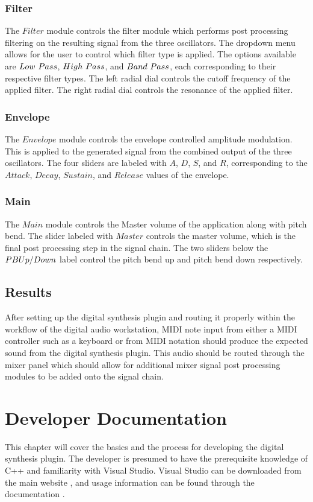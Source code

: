 \documentclass[a4paper,12pt]{report}
\begin{document}
\subsection{Filter}
\label{subsec:filter}
The $Filter$ module controls the filter module which performs post processing filtering on the resulting signal from the three oscillators. The dropdown menu allows for the user to control which filter type is applied. The options available are $Low\ \-Pass$, $High\ \-Pass$, and $Band\ \-Pass$, each corresponding to their respective filter types. The left radial dial controls the cutoff frequency of the applied filter. The right radial dial controls the resonance of the applied filter.

\subsection{Envelope}
\label{subsec:env}
The $Envelope$ module controls the envelope controlled amplitude modulation. This is applied to the generated signal from the combined output of the three oscillators. The four sliders are labeled with $A$, $D$, $S$, and $R$, corresponding to the $Attack$, $Decay$, $Sustain$, and $Release$ values of the envelope.

\subsection{Main}
\label{subsec:main}
The $Main$ module controls the Master volume of the application along with pitch bend. The slider labeled with $Master$ controls the master volume, which is the final post processing step in the signal chain. The two sliders below the $PB \-Up/Down$ label control the pitch bend up and pitch bend down respectively.

\section{Results}
After setting up the digital synthesis plugin and routing it properly within the workflow of the digital audio workstation, MIDI note input from either a MIDI controller such as a keyboard or from MIDI notation should produce the expected sound from the digital synthesis plugin. This audio should be routed through the mixer panel which should allow for additional mixer signal post processing modules to be added onto the signal chain.

\chapter{Developer Documentation}
\label{chapter:devdocs}
This chapter will cover the basics and the process for developing the digital synthesis plugin. The developer is presumed to have the prerequisite knowledge of C++ and familiarity with Visual Studio. Visual Studio can be downloaded from the main website \cite{visualstudio}, and usage information can be found through the documentation \cite{vsdocs}.
\end{document}
